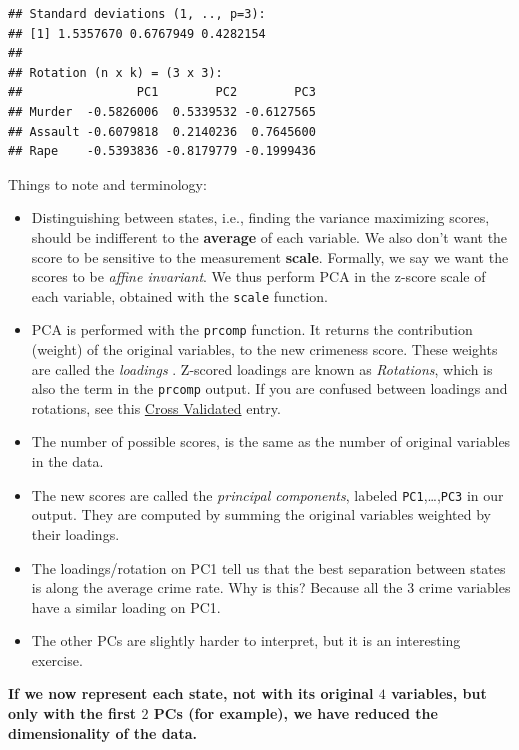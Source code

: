 \documentclass[]{book}
\theoremstyle{definition}
\theoremstyle{definition}
\theoremstyle{definition}
\theoremstyle{remark}
\begin{document}
\begin{verbatim}
## Standard deviations (1, .., p=3):
## [1] 1.5357670 0.6767949 0.4282154
## 
## Rotation (n x k) = (3 x 3):
##                PC1        PC2        PC3
## Murder  -0.5826006  0.5339532 -0.6127565
## Assault -0.6079818  0.2140236  0.7645600
## Rape    -0.5393836 -0.8179779 -0.1999436
\end{verbatim}

Things to note and terminology:

\begin{itemize}
\item
  Distinguishing between states, i.e., finding the variance maximizing
  scores, should be indifferent to the \textbf{average} of each
  variable. We also don't want the score to be sensitive to the
  measurement \textbf{scale}. Formally, we say we want the scores to be
  \emph{affine invariant}. We thus perform PCA in the z-score scale of
  each variable, obtained with the \texttt{scale} function.
\item
  PCA is performed with the \texttt{prcomp} function. It returns the
  contribution (weight) of the original variables, to the new crimeness
  score. These weights are called the \emph{loadings} . Z-scored
  loadings are known as \emph{Rotations}, which is also the term in the
  \texttt{prcomp} output. If you are confused between loadings and
  rotations, see this
  \href{https://stats.stackexchange.com/questions/143905/loadings-vs-eigenvectors-in-pca-when-to-use-one-or-another}{Cross
  Validated} entry.
\item
  The number of possible scores, is the same as the number of original
  variables in the data.
\item
  The new scores are called the \emph{principal components}, labeled
  \texttt{PC1},\ldots{},\texttt{PC3} in our output. They are computed by
  summing the original variables weighted by their loadings.
\item
  The loadings/rotation on PC1 tell us that the best separation between
  states is along the average crime rate. Why is this? Because all the
  \(3\) crime variables have a similar loading on PC1.
\item
  The other PCs are slightly harder to interpret, but it is an
  interesting exercise.
\end{itemize}

\textbf{If we now represent each state, not with its original \(4\)
variables, but only with the first \(2\) PCs (for example), we have
reduced the dimensionality of the data.}
\end{document}
